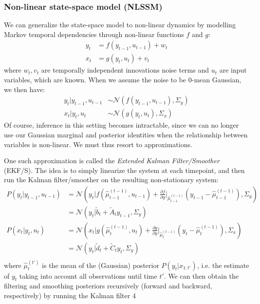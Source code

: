 \documentclass[a4paper]{article}
\begin{document}
\subsubsection{Non-linear state-space model (NLSSM)} \label{nlssm}
We can generalize the state-space model to non-linear dynamics by modelling Markov temporal dependencies through non-linear functions $f$ and $g$:
\begin{align*}
y_t &= f(y_{t-1},u_{t-1}) + w_t \\
x_t &= g(y_t,u_t) + v_t
\end{align*}
where $w_t,v_t$ are temporally independent innovations noise terms and $u_t$ are input variables, which are known. When we assume the noise to be 0-mean Gaussian, we then have:
\begin{align*}
y_t|y_{t-1},u_{t-1} &\sim \mathcal{N}\left( f(y_{t-1},u_{t-1}), \Sigma_y \right) \\
x_t|y_t,u_t &\sim \mathcal{N}\left( g(y_t,u_t), \Sigma_x \right)
\end{align*}
Of course, inference in this setting becomes intractable, since we can no longer use our Gaussian marginal and posterior identities when the relationship between variables is non-linear. We must thus resort to approximations.

One such approximation is called the \emph{Extended Kalman Filter/Smoother} (EKF/S). The idea is to simply linearize the system at each timepoint, and then run the Kalman filter/smoother on the resulting non-stationary system:
\begin{align*}
 P(y_t|y_{t-1},u_{t-1}) &= \mathcal{N}\left(y_t \Bigr| f(\hat{\mu}_{t-1}^{(t-1)},u_{t-1}) + \frac{\partial f}{\partial y}\Bigr|_{\hat{\mu}_{t-1}^{(t-1)}} (y_{t-1} - \hat{\mu}_{t-1}^{(t-1)}), \Sigma_y \right) \\
 &= \mathcal{N}\left(y_t \Bigr| \tilde{b}_t + \tilde{A}_ty_{t-1}, \Sigma_y \right) \\
 P(x_t|y_t,u_t) &= \mathcal{N}\left(x_t \Bigr| g(\hat{\mu}_t^{(t-1)},u_t) + \frac{\partial g}{\partial y}\Bigr|_{\hat{\mu}_t^{(t-1)}} (y_t - \hat{\mu}_t^{(t-1)}), \Sigma_x \right) \\
 &= \mathcal{N}\left(y_t \Bigr| \tilde{d}_t + \tilde{C}_ty_t, \Sigma_y \right) \\
 \end{align*} 
 where $\hat{\mu}_t^{(t')}$ is the mean of the (Gaussian) posterior $P(y_t|x_{1:t'})$, i.e. the estimate of $y_t$ taking into account all observations until time $t'$. We can then obtain the filtering and smoothing posteriors recursively (forward and backward, respectively) by running the Kalman filter 4
\end{document}
